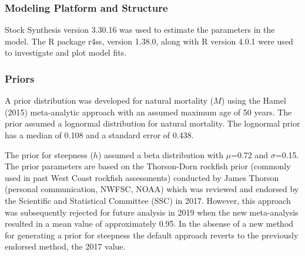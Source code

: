 \documentclass[11pt,
  english,
  a4paper,
]{article}
\begin{document}
\leavevmode\tagmcend\tagstructend\par


\hypertarget{modeling-platform-and-structure}{%
\subsubsection{Modeling Platform and Structure}\label{modeling-platform-and-structure}}

\leavevmode\tagmcend\tagstructend


Stock Synthesis version 3.30.16 was used to estimate the parameters in the model. The R package r4ss, version 1.38.0, along with R version 4.0.1 were used to investigate and plot model fits.

\leavevmode\tagmcend\tagstructend\par


\hypertarget{priors}{%
\subsubsection{Priors}\label{priors}}

\leavevmode\tagmcend\tagstructend


A prior distribution was developed for natural mortality ({\(M\)\leavevmode\tagmcend\tagstructend}) using the Hamel {(2015)\leavevmode\tagmcend\tagstructend} meta-analytic approach with an assumed maximum age of 50 years. The prior assumed a lognormal distribution for natural mortality. The lognormal prior has a median of 0.108 and a standard error of 0.438.

\leavevmode\tagmcend\tagstructend\par


The prior for steepness ({\(h\)\leavevmode\tagmcend\tagstructend}) assumed a beta distribution with {\(\mu\)\leavevmode\tagmcend\tagstructend}=0.72 and {\(\sigma\)\leavevmode\tagmcend\tagstructend}=0.15.\\
The prior parameters are based on the Thorson-Dorn rockfish prior (commonly used in past West Coast rockfish assessments) conducted by James Thorson (personal communication, NWFSC, NOAA) which was reviewed and endorsed by the Scientific and Statistical Committee (SSC) in 2017. However, this approach was subsequently rejected for future analysis in 2019 when the new meta-analysis resulted in a mean value of approximately 0.95. In the absense of a new method for generating a prior for steepness the default approach reverts to the previously endorsed method, the 2017 value.
\end{document}
